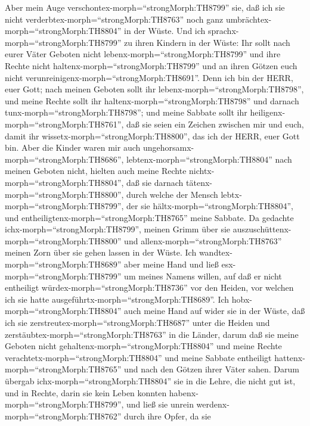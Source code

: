  Aber mein Auge verschontex-morph=``strongMorph:TH8799''
sie, daß ich sie nicht verderbtex-morph=``strongMorph:TH8763'' noch ganz
umbrächtex-morph=``strongMorph:TH8804'' in der Wüste.  Und
ich sprachx-morph=``strongMorph:TH8799'' zu ihren Kindern in der Wüste:
Ihr sollt nach eurer Väter Geboten nicht
lebenx-morph=``strongMorph:TH8799'' und ihre Rechte nicht
haltenx-morph=``strongMorph:TH8799'' und an ihren Götzen euch nicht
verunreinigenx-morph=``strongMorph:TH8691''.  Denn ich bin
der HERR, euer Gott; nach meinen Geboten sollt ihr
lebenx-morph=``strongMorph:TH8798'', und meine Rechte sollt ihr
haltenx-morph=``strongMorph:TH8798'' und darnach
tunx-morph=``strongMorph:TH8798'';  und meine Sabbate sollt
ihr heiligenx-morph=``strongMorph:TH8761'', daß sie seien ein Zeichen
zwischen mir und euch, damit ihr wissetx-morph=``strongMorph:TH8800'',
das ich der HERR, euer Gott bin.  Aber die Kinder waren mir
auch ungehorsamx-morph=``strongMorph:TH8686'',
lebtenx-morph=``strongMorph:TH8804'' nach meinen Geboten nicht, hielten
auch meine Rechte nichtx-morph=``strongMorph:TH8804'', daß sie darnach
tätenx-morph=``strongMorph:TH8800'', durch welche der Mensch
lebtx-morph=``strongMorph:TH8799'', der sie
hältx-morph=``strongMorph:TH8804'', und
entheiligtenx-morph=``strongMorph:TH8765'' meine Sabbate. Da gedachte
ichx-morph=``strongMorph:TH8799'', meinen Grimm über sie
auszuschüttenx-morph=``strongMorph:TH8800'' und
allenx-morph=``strongMorph:TH8763'' meinen Zorn über sie gehen lassen in
der Wüste.  Ich wandtex-morph=``strongMorph:TH8689'' aber
meine Hand und ließ esx-morph=``strongMorph:TH8799'' um meines Namens
willen, auf daß er nicht entheiligt würdex-morph=``strongMorph:TH8736''
vor den Heiden, vor welchen ich sie hatte
ausgeführtx-morph=``strongMorph:TH8689''.  Ich
hobx-morph=``strongMorph:TH8804'' auch meine Hand auf wider sie in der
Wüste, daß ich sie zerstreutex-morph=``strongMorph:TH8687'' unter die
Heiden und zerstäubtex-morph=``strongMorph:TH8763'' in die Länder,
 darum daß sie meine Geboten nicht
gehaltenx-morph=``strongMorph:TH8804'' und meine Rechte
verachtetx-morph=``strongMorph:TH8804'' und meine Sabbate entheiligt
hattenx-morph=``strongMorph:TH8765'' und nach den Götzen ihrer Väter
sahen.  Darum übergab ichx-morph=``strongMorph:TH8804'' sie
in die Lehre, die nicht gut ist, und in Rechte, darin sie kein Leben
konnten habenx-morph=``strongMorph:TH8799'',  und ließ sie
unrein werdenx-morph=``strongMorph:TH8762'' durch ihre Opfer, da sie
